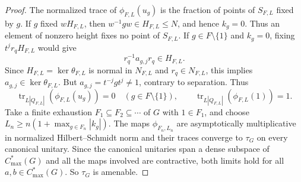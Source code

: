 \documentclass[11pt]{amsart}
\theoremstyle{plain}
\newcommand{\tr}{\operatorname{tr}}
\begin{document}
\begin{proof}
The normalized trace of $\phi_{F,L}(u_g)$ is the fraction of points of
$S_{F,L}$ fixed by $g$.  If $g$ fixed $wH_{F,L}$, then
$w^{-1}gw\in H_{F,L}\leq N$, and hence $k_g=0$.  Thus an element of nonzero
height fixes no point of $S_{F,L}$.  If $g\in F\setminus\{1\}$ and $k_g=0$,
fixing $t^jr_qH_{F,L}$ would give
\[
 r_q^{-1}a_{g,j}r_q\in H_{F,L}.
\]
Since $H_{F,L}=\ker\theta_{F,L}$ is normal in $N_{F,L}$ and
$r_q\in N_{F,L}$, this implies $a_{g,j}\in\ker\theta_{F,L}$.
But $a_{g,j}=t^{-j}gt^j\ne1$, contrary to separation.  Thus
\[
 \tr_{L|Q_{F,L}|}(\phi_{F,L}(u_g))=0
 \quad(g\in F\setminus\{1\}),
 \qquad
 \tr_{L|Q_{F,L}|}(\phi_{F,L}(1))=1.
\]
Take a finite exhaustion $F_1\subseteq F_2\subseteq\cdots$ of $G$ with
$1\in F_1$, and choose $L_n\ge n(1+\max_{g\in F_n}|k_g|)$.
The maps $\phi_{F_n,L_n}$ are asymptotically
multiplicative in normalized Hilbert--Schmidt norm and their traces converge
to $\tau_G$ on every canonical unitary.  Since the canonical unitaries
span a dense subspace of $C^*_{\max}(G)$ and all the maps involved are
contractive, both limits hold for all $a,b\in C^*_{\max}(G)$.  So
$\tau_G$ is amenable.
\end{proof}
\end{document}
